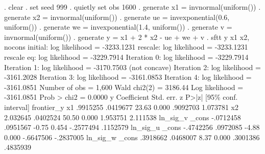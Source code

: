 . clear
{\smallskip}
. set seed 999
{\smallskip}
. quietly set obs 1600
{\smallskip}
. generate x1 = invnormal(uniform())
{\smallskip}
. generate x2 = invnormal(uniform())
{\smallskip}
. generate ue = invexponential(0.6, uniform())
{\smallskip}
. generate we = invexponential(1.4, uniform())
{\smallskip}
. generate v = invnormal(uniform())
{\smallskip}
. generate y = x1 + 2 * x2 - ue + we + v
{\smallskip}
. sftt y x1 x2, nocons
{\smallskip}
initial:       log likelihood = -3233.1231
rescale:       log likelihood = -3233.1231
rescale eq:    log likelihood = -3229.7914
Iteration 0:   log likelihood = -3229.7914  
Iteration 1:   log likelihood = -3170.7503  (not concave)
Iteration 2:   log likelihood = -3161.2028  
Iteration 3:   log likelihood = -3161.0853  
Iteration 4:   log likelihood = -3161.0851  
{\smallskip}
{}
{\smallskip}
                                                       Number of obs =   1,600
                                                       Wald chi2(2)  = 3186.44
Log likelihood = -3161.0851                            Prob > chi2   =  0.0000
{\smallskip}
           y {\VBAR} Coefficient  Std. err.      z    P>|z|     [95\% conf. interval]
frontier_y   {\VBAR}
          x1 {\VBAR}   .9915255   .0419677    23.63   0.000     .9092703    1.073781
          x2 {\VBAR}   2.032645   .0402524    50.50   0.000     1.953751    2.111538
ln_sig_v     {\VBAR}
       _cons {\VBAR}  -.0712458   .0951567    -0.75   0.454    -.2577494    .1152579
ln_sig_u     {\VBAR}
       _cons {\VBAR}  -.4742256   .0972085    -4.88   0.000    -.6647506   -.2837005
ln_sig_w     {\VBAR}
       _cons {\VBAR}   .3918662   .0468007     8.37   0.000     .3001386    .4835939
